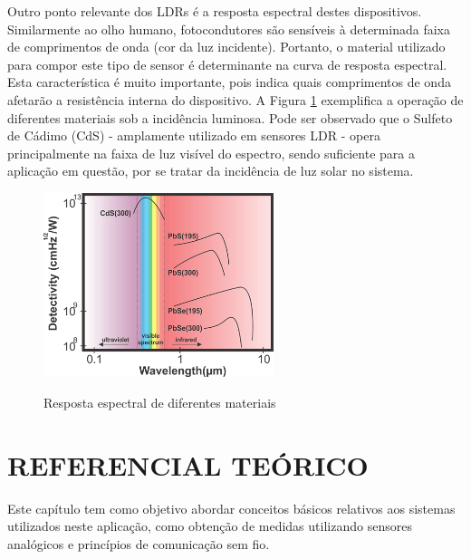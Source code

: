 \documentclass[oneside,openright,12pt]{ufsm_2015} %
\begin{document}
Outro ponto relevante dos LDRs é a resposta espectral destes dispositivos. Similarmente ao olho humano, fotocondutores são sensíveis à determinada faixa de comprimentos de onda (cor da luz incidente). Portanto, o material utilizado para compor este tipo de sensor é determinante na curva de resposta espectral. Esta característica é muito importante, pois indica quais comprimentos de onda afetarão a resistência interna do dispositivo. A Figura \ref{fig:wavelength} exemplifica a operação de diferentes materiais sob a incidência luminosa. Pode ser observado que o Sulfeto de Cádimo (CdS) - amplamente utilizado em sensores LDR - opera principalmente na faixa de luz visível do espectro, sendo suficiente para a aplicação em questão, por se tratar da incidência de luz solar no sistema.
\begin{figure}[H]
    \caption{\label{exepretex} Resposta espectral de diferentes materiais}
    \centering
    \includegraphics[width=0.6\textwidth]{figuras/wavelength-detectivity.png}
    \vspace{\baselineskip} %
        \label{fig:wavelength}
\end{figure}



\chapter{REFERENCIAL TEÓRICO}
Este capítulo tem como objetivo abordar conceitos básicos relativos aos sistemas utilizados neste aplicação, como obtenção de medidas utilizando sensores analógicos e princípios de comunicação sem fio.
\end{document}
